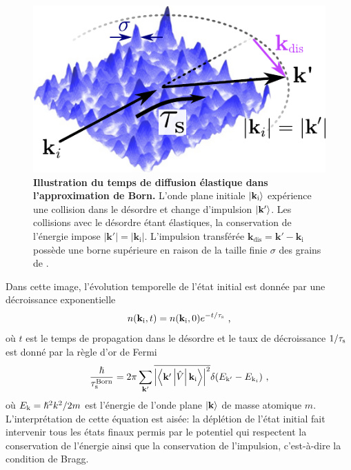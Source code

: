 \begin{figure}
\centering
\includegraphics[scale=1]{Fig/TauS_PRL/illustration_contexte_taus.pdf}
\caption{\textbf{Illustration du temps de diffusion élastique dans l'approximation de Born.} L'onde plane initiale $\left| \mathbf{k}_{\mathrm{i}} \right\rangle$ expérience une collision dans le désordre et change d'impulsion $\left| \mathbf{k}' \right\rangle$. Les collisions avec le désordre étant élastiques, la conservation de l'énergie impose $\left|\mathbf{k}'\right|=\left|\mathbf{k}_{\mathrm{i}}\right|$. L'impulsion transférée $\mathbf{k}_{\mathrm{dis}}=\mathbf{k}'-\mathbf{k}_{\mathrm{i}}$ possède une borne supérieure en raison de la taille finie $\sigma$ des grains de \speckle .}
\label{fig:illustration_contexte_taus}
\end{figure}


Dans cette image, l'évolution temporelle de l'état initial est donnée par une décroissance exponentielle 
\begin{equation}
n(\mathbf{k}_{\mathrm{i}},t)=n(\mathbf{k}_{\mathrm{i}},0) e^{-t/\tau_{\mathrm{s}}} \text{ ,}
\label{eq:decroissance_exponentielle_taus}
\end{equation}
où $t$ est le temps de propagation dans le désordre et le taux de décroissance $1/\tau_{\mathrm{s}}$ est donné par la règle d'or de Fermi
\begin{equation}
\frac{\hslash}{\tau_{\mathrm{s}}^{\mathrm{Born}}}=2\pi \sum_{\mathbf{k}'}{\overline{\left |\left\langle \mathbf{k}' \left|  \hat{V} \right| \mathbf{k}_{\mathrm{i}} \right\rangle \right|^2} \delta(E_{\mathrm{k}'} - E_{\mathrm{k}_i})} \text{ ,}
\label{eq:fermi_golden_rule}
\end{equation}
où $E_{\mathrm{k}}=\hslash^2 k^2 /2m$ est l'énergie de l'onde plane $\left| \mathbf{k} \right\rangle$ de masse atomique $m$. L'interprétation de cette équation est aisée: la déplétion de l'état initial fait intervenir tous les états finaux permis par le potentiel qui respectent la conservation de l'énergie ainsi que la conservation de l'impulsion, c'est-à-dire la condition de Bragg. 

